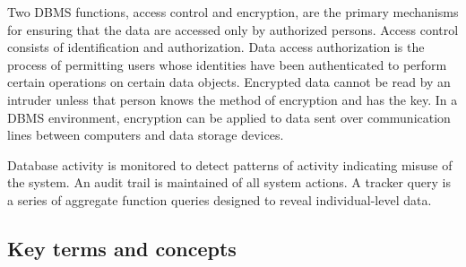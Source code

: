 \documentclass[
]{article}
\begin{document}
Two DBMS functions, access control and encryption, are the primary
mechanisms for ensuring that the data are accessed only by authorized
persons. Access control consists of identification and authorization.
Data access authorization is the process of permitting users whose
identities have been authenticated to perform certain operations on
certain data objects. Encrypted data cannot be read by an intruder
unless that person knows the method of encryption and has the key. In a
DBMS environment, encryption can be applied to data sent over
communication lines between computers and data storage devices.

Database activity is monitored to detect patterns of activity indicating
misuse of the system. An audit trail is maintained of all system
actions. A tracker query is a series of aggregate function queries
designed to reveal individual-level data.

\hypertarget{key-terms-and-concepts-11}{%
\subsection*{Key terms and concepts}\label{key-terms-and-concepts-11}}
\end{document}

